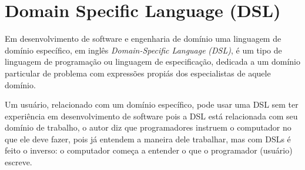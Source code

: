 \section{Domain Specific Language (DSL)\foreignlanguage{brazil}{ }}

%
Em desenvolvimento de software e engenharia de domínio uma linguagem
de domínio específico, em inglês \foreignlanguage{english}{\emph{Domain-Specific
Language}}\emph{ (DSL)}, é um tipo de linguagem de programação ou
linguagem de especificação, dedicada a um domínio particular de problema
com expressões propiás dos especialistas de aquele domínio.

Um usuário, relacionado com um domínio específico, pode usar uma DSL
sem ter experiência em desenvolvimento de software pois a DSL está
relacionada com seu domínio de trabalho, o autor \citet{fowler2010domain}
diz que programadores instruem o computador no que ele deve fazer,
pois já entendem a maneira dele trabalhar, mas com \foreignlanguage{english}{DSLs}
é feito o inverso: o computador começa a entender o que o programador
(usuário) escreve.

